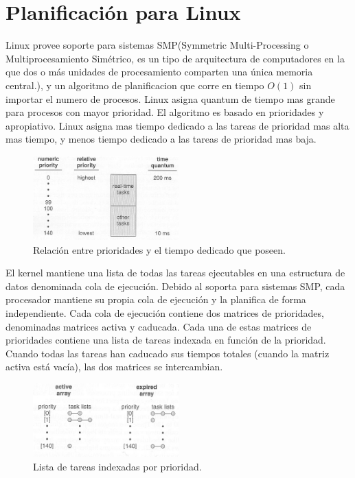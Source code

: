 \documentclass{article}
\newcommand{\bigO}[1]{$O({#1})$}
\begin{document}
\section*{Planificación para Linux}

Linux provee soporte para sistemas SMP(Symmetric Multi-Processing o Multiprocesamiento Simétrico, 
es un tipo de arquitectura de computadores en la que dos o más unidades de procesamiento comparten 
una única memoria central.), y un algoritmo de planificacion que corre en tiempo \bigO{1} sin importar 
el numero de procesos. Linux asigna quantum de tiempo mas grande para procesos con mayor prioridad.
El algoritmo es basado en prioridades y apropiativo.
Linux asigna mas tiempo dedicado a las tareas de prioridad mas alta mas tiempo, y menos tiempo dedicado a las tareas
de prioridad mas baja.


\begin{figure}[h]
	\centering
	\includegraphics[width=0.5\textwidth]{img/5_15_PrioritiesVS_Length}
	\caption{\label{img:linux1}Relación entre prioridades y el tiempo dedicado que poseen.}
\end{figure}

El kernel mantiene una lista de todas las tareas ejecutables en una estructura de datos denominada cola de ejecución.
Debido al soporta para sistemas SMP, cada procesador mantiene su propia cola de ejecución y la planifica de forma
independiente. Cada cola de ejecución contiene dos matrices de prioridades, denominadas matrices activa y caducada.
Cada una de estas matrices de prioridades contiene una lista de tareas indexada en función de la prioridad.
Cuando todas las tareas han caducado sus tiempos totales (cuando la matriz activa está vacía), las dos matrices se intercambian.

\begin{figure}[h]
	\centering
	\includegraphics[width=0.5\textwidth]{img/5_16_TaskList}
	\caption{\label{img:linux2}Lista de tareas indexadas por prioridad.}
\end{figure}
\newpage
\end{document}
